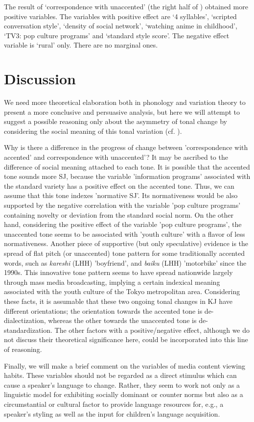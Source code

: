 \documentclass[output=paper]{LSP/langsci}
\begin{document}
The result of  ‘correspondence with unaccented’ (the right half of ) obtained more positive variables. The variables with positive effect are ‘4 syllables’, ‘scripted conversation style’, ‘density of social network’, ‘watching anime in childhood’, ‘TV3: pop culture programs’ and ‘standard style score’. The negative effect variable is ‘rural’ only. There are no marginal ones.

\section{Discussion}
We need more theoretical elaboration both in phonology and variation theory to present a more conclusive and persuasive analysis, but here we will attempt to suggest a possible reasoning only about the asymmetry of tonal change by considering the social meaning of this tonal variation (cf. \citealt{eckert_variation_2008}). 

Why is there a difference in the progress of change between 'correspondence with accented' and correspondence with unaccented'? It may be ascribed to the difference of social meaning attached to each tone. It is possible that the accented tone sounds more SJ, because the variable 'information programs' associated with the standard variety has a positive effect on the accented tone. Thus, we can assume that this tone indexes 'normative SJ'. Its normativeness would be also supported by the negative correlation with the variable 'pop culture programs' containing novelty or deviation from the standard social norm. On the other hand, considering the positive effect of the variable 'pop culture programs', the unaccented tone seems to be associated with 'youth culture' with a flavor of less normativeness. Another piece of supportive (but only speculative) evidence is the spread of flat pitch (or unaccented) tone pattern for some traditionally accented words, such as \textit{kareshi }(LHH) 'boyfriend', and \textit{baiku} (LHH) 'motorbike' since the 1990s. This innovative tone pattern seems to have spread nationwide largely through mass media broadcasting, implying a certain indexical meaning associated with the youth culture of the Tokyo metropolitan area. Considering these facts, it is assumable that these two ongoing tonal changes in KJ have different orientations; the orientation towards the accented tone is de-dialectization, whereas the other towards the unaccented tone is de-standardization. The other factors with a positive/negative effect, although we do not discuss their theoretical significance here, could be incorporated into this line of reasoning.

Finally, we will make a brief comment on the variables of media content viewing habits.  These variables should not be regarded as a direct stimulus which can cause a speaker’s language to change. Rather, they seem to work not only as a linguistic model for exhibiting socially dominant or counter norms but also as a circumstantial or cultural factor to provide language resources for, e.g., a speaker’s styling as well as the input for children’s language acquisition.
     
\printbibliography[heading=subbibliography,notkeyword=this]
\end{document}
